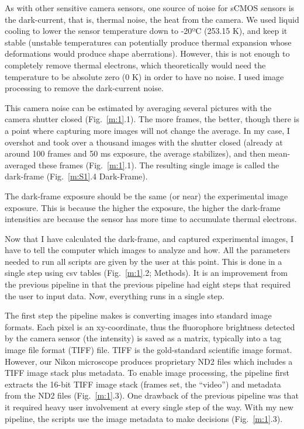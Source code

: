As with other sensitive camera sensors, one source of noise for sCMOS sensors is the dark-current, that is, thermal noise, the heat from the camera. We used liquid cooling to lower the sensor temperature down to -20ºC (253.15 K), and keep it stable (unstable temperatures can potentially produce thermal expansion whose deformations would produce shape aberrations). However, this is not enough to completely remove thermal electrons, which theoretically would need the temperature to be absolute zero (0 K) in order to have no noise. I used image processing to remove the dark-current noise.

This camera noise can be estimated by averaging several pictures with the camera shutter closed (Fig.~\ref{m:1}.1). The more frames, the better, though there is a point where capturing more images will not change the average. In my case, I overshot and took over a thousand images with the shutter closed (already at around 100 frames and 50 ms exposure, the average stabilizes), and then mean-averaged these frames (Fig.~\ref{m:1}.1). The resulting single image is called the dark-frame (Fig.~\ref{m:S1}.4 Dark-Frame).

The dark-frame exposure should be the same (or near) the experimental image exposure. This is because the higher the exposure, the higher the dark-frame intensities are because the sensor has more time to accumulate thermal electrons.

Now that I have calculated the dark-frame, and captured experimental images, I have to tell the computer which images to analyze and how. All the parameters needed to run all scripts are given by the user at this point. This is done in a single step using csv tables (Fig.~\ref{m:1}.2; Methods). It is an improvement from the previous pipeline in that the previous pipeline had eight steps that required the user to input data. Now, everything runs in a single step.

The first step the pipeline makes is converting images into standard image formats. Each pixel is an xy-coordinate, thus the fluorophore brightness detected by the camera sensor (the intensity) is saved as a matrix, typically into a tag image file format (TIFF) file. TIFF is the gold-standard scientific image format. However, our Nikon microscope produces proprietary ND2 files which includes a TIFF image stack plus metadata. To enable image processing, the pipeline first extracts the 16-bit TIFF image stack (frames set, the “video”) and metadata from the ND2 files (Fig.~\ref{m:1}.3). One drawback of the previous pipeline was that it required heavy user involvement at every single step of the way. With my new pipeline, the scripts use the image metadata to make decisions (Fig.~\ref{m:1}.3). 

